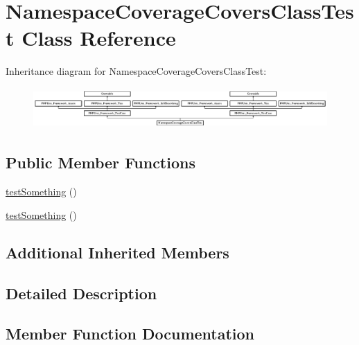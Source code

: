 \hypertarget{class_namespace_coverage_covers_class_test}{}\section{Namespace\+Coverage\+Covers\+Class\+Test Class Reference}
\label{class_namespace_coverage_covers_class_test}
Inheritance diagram for Namespace\+Coverage\+Covers\+Class\+Test\+:\begin{figure}[H]
\begin{center}
\leavevmode
\includegraphics[height=1.575246cm]{class_namespace_coverage_covers_class_test}
\end{center}
\end{figure}
\subsection*{Public Member Functions}
\begin{DoxyCompactItemize}
\item 
\mbox{\hyperlink{class_namespace_coverage_covers_class_test_a0fc4e17369bc9607ebdd850d9eda8167}{test\+Something}} ()
\item 
\mbox{\hyperlink{class_namespace_coverage_covers_class_test_a0fc4e17369bc9607ebdd850d9eda8167}{test\+Something}} ()
\end{DoxyCompactItemize}
\subsection*{Additional Inherited Members}


\subsection{Detailed Description}


\subsection{Member Function Documentation}
\mbox{\label{class_namespace_coverage_covers_class_test_a0fc4e17369bc9607ebdd850d9eda8167}} 
